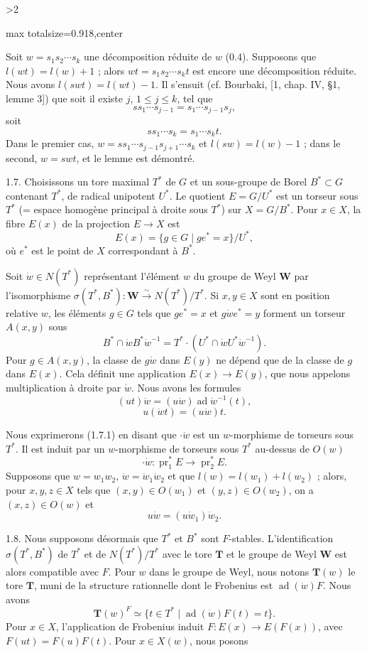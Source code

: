 \documentclass[9pt,twoside]{extarticle}
\newcommand{\EditionPage}[3]{%
  \ifnum#1>2\clearpage\fi
  \pdfbookmark[1]{Printed page #2}{fr-folio-#2}%
  \hypertarget{fr-physical-#1}{}%
  \noindent\begin{adjustbox}{max totalsize={\textwidth}{0.918\textheight},center}
  \begin{minipage}[t]{\textwidth}
  \fontsize{9.4}{11.1}\selectfont\justifying
  #3
  \end{minipage}
  \end{adjustbox}%
}
\begin{document}
\EditionPage{9}{110}{%
Soit \(w=s_1s_2\cdots s_k\) une décomposition réduite de \(w\) (0.4). Supposons que \(l(wt)=l(w)+1\) ; alors \(wt=s_1s_2\cdots s_kt\) est encore une décomposition réduite. Nous avons \(l(swt)=l(wt)-1\). Il s'ensuit (cf. Bourbaki, [1, chap. IV, §1, lemme 3]) que soit il existe \(j\), \(1\le j\le k\), tel que \[
ss_1\cdots s_{j-1}=s_1\cdots s_{j-1}s_j,
\] soit \[
ss_1\cdots s_k=s_1\cdots s_kt.
\] Dans le premier cas, \(w=ss_1\cdots s_{j-1}s_{j+1}\cdots s_k\) et \(l(sw)=l(w)-1\) ; dans le second, \(w=swt\), et le lemme est démontré.\par

1.7. Choisissons un tore maximal \(T^*\) de \(G\) et un sous-groupe de Borel \(B^*\subset G\) contenant \(T^*\), de radical unipotent \(U^*\). Le quotient \(E=G/U^*\) est un torseur sous \(T^*\) (= espace homogène principal à droite sous \(T^*\)) sur \(X=G/B^*\). Pour \(x\in X\), la fibre \(E(x)\) de la projection \(E\to X\) est \[
E(x)=\{g\in G\mid ge^*=x\}/U^*,
\] où \(e^*\) est le point de \(X\) correspondant à \(B^*\).\par

Soit \(\dot w\in N(T^*)\) représentant l'élément \(w\) du groupe de Weyl \(\mathbf W\) par l'isomorphisme \(\sigma(T^*,B^*):\mathbf W\xrightarrow{\sim}N(T^*)/T^*\). Si \(x,y\in X\) sont en position relative \(w\), les éléments \(g\in G\) tels que \(ge^*=x\) et \(g\dot we^*=y\) forment un torseur \(A(x,y)\) sous \[
B^*\cap \dot wB^*\dot w^{-1}=T^*\cdot(U^*\cap \dot wU^*\dot w^{-1}).
\] Pour \(g\in A(x,y)\), la classe de \(g\dot w\) dans \(E(y)\) ne dépend que de la classe de \(g\) dans \(E(x)\). Cela définit une application \(E(x)\to E(y)\), que nous appelons multiplication à droite par \(\dot w\). Nous avons les formules \[
\tag{1.7.1}
(ut)\dot w=(u\dot w)\operatorname{ad}\dot w^{-1}(t),
\]  \[
\tag{1.7.2}
u(\dot w t)=(u\dot w)t.
\]\par

Nous exprimerons (1.7.1) en disant que \(\cdot\dot w\) est un \(w\)-morphisme de torseurs sous \(T^*\). Il est induit par un \(w\)-morphisme de torseurs sous \(T^*\) au-dessus de \(O(w)\)  \[
\cdot\dot w:\operatorname{pr}_1^*E\longrightarrow\operatorname{pr}_2^*E.
\] Supposons que \(w=w_1w_2\), \(\dot w=\dot w_1\dot w_2\) et que \(l(w)=l(w_1)+l(w_2)\) ; alors, pour \(x,y,z\in X\) tels que \((x,y)\in O(w_1)\) et \((y,z)\in O(w_2)\), on a \((x,z)\in O(w)\) et \[
\tag{1.7.3}
u\dot w=(u\dot w_1)\dot w_2.
\]\par

1.8. Nous supposons désormais que \(T^*\) et \(B^*\) sont \(F\)-stables. L'identification \(\sigma(T^*,B^*)\) de \(T^*\) et de \(N(T^*)/T^*\) avec le tore \(\mathbf T\) et le groupe de Weyl \(\mathbf W\) est alors compatible avec \(F\). Pour \(w\) dans le groupe de Weyl, nous notons \(\mathbf T(w)\) le tore \(\mathbf T\), muni de la structure rationnelle dont le Frobenius est \(\operatorname{ad}(\dot w)F\). Nous avons \[
\mathbf T(w)^F\simeq\{t\in T^*\mid \operatorname{ad}(\dot w)F(t)=t\}.
\] Pour \(x\in X\), l'application de Frobenius induit \(F:E(x)\to E(F(x))\), avec \(F(ut)=F(u)F(t)\). Pour \(x\in X(w)\), nous posons\par
}
\end{document}

